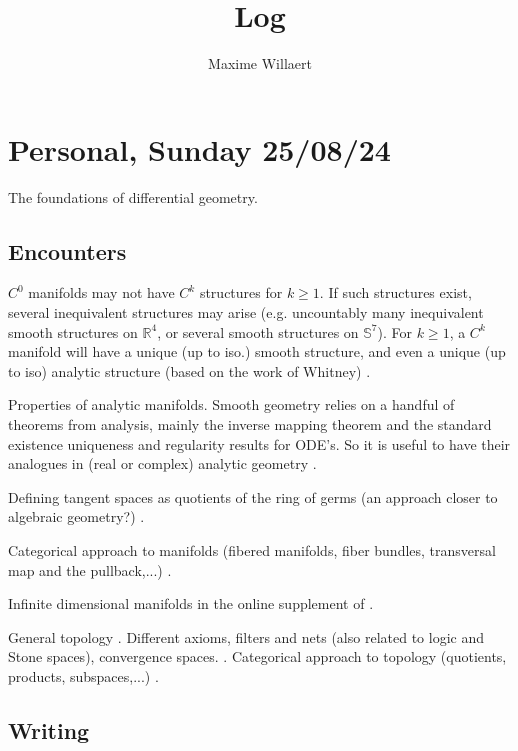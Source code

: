 \documentclass[a4paper,12pt,parskip=half*,chapterprefix=true,numbers=noendperiod]{scrreprt}
\title{Log}
\author{Maxime Willaert}
\theoremstyle{definition}
\theoremstyle{remark}
\begin{document}
\maketitle

\tableofcontents

\section{Personal, Sunday 25/08/24}

The foundations of differential geometry.

\subsection{Encounters}

$C^0$ manifolds may not have $C^k$ structures for $k\geq 1$. If such structures exist, several inequivalent structures may arise (e.g. uncountably many inequivalent smooth structures on $\mathbb{R}^4$, or several smooth structures on $\mathbb{S}^7$). For $k\geq 1$, a $C^k$ manifold will have a unique (up to iso.) smooth structure, and even a unique (up to iso) analytic structure (based on the work of Whitney) \cite{Overflow:ManifoldAnalyticStructure,Stack:WhitneyAnalyticEmbedding}.

Properties of analytic manifolds. Smooth geometry relies on a handful of theorems from analysis, mainly the inverse mapping theorem and the standard existence uniqueness and regularity results for ODE's. So it is useful to have their analogues in (real or complex) analytic geometry \cite{Narasimhan:AnalysisRealComplexMan,Bourbaki:VarietesDiffAnalytic}.

Defining tangent spaces as quotients of the ring of germs (an approach closer to algebraic geometry?) \cite{Warner:DiffMan}.

Categorical approach to manifolds (fibered manifolds, fiber bundles, transversal map and the pullback,...) \cite{KMS:NatDiffGeo}.

Infinite dimensional manifolds in the online supplement of \cite{Lee:ManDiffGeo}.

General topology \cite{Munkres:Top}. Different axioms, filters and nets (also related to logic and Stone spaces), convergence spaces. \cite{Wiki:AxiomTop,Wiki:FiltersTop,Wiki:ConvergenceSpace}. Categorical approach to topology (quotients, products, subspaces,...) \cite{Lee:IntTopMan}.

\subsection{Writing}
\end{document}
